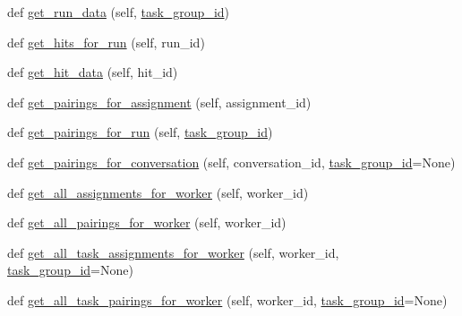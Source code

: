 \begin{DoxyCompactItemize}
\item 
def \hyperlink{classparlai_1_1mturk_1_1core_1_1mturk__data__handler_1_1MTurkDataHandler_a3ded92bcc9f19027c452489e2b06d837}{get\+\_\+run\+\_\+data} (self, \hyperlink{classparlai_1_1mturk_1_1core_1_1mturk__data__handler_1_1MTurkDataHandler_abef46871b0b4686b67f0b4dcea99e81c}{task\+\_\+group\+\_\+id})
\item 
def \hyperlink{classparlai_1_1mturk_1_1core_1_1mturk__data__handler_1_1MTurkDataHandler_a9f4e9c9bec7d5d47efd4492dfb751b5c}{get\+\_\+hits\+\_\+for\+\_\+run} (self, run\+\_\+id)
\item 
def \hyperlink{classparlai_1_1mturk_1_1core_1_1mturk__data__handler_1_1MTurkDataHandler_a753c4a107539e6085fb2fd8402ed35e2}{get\+\_\+hit\+\_\+data} (self, hit\+\_\+id)
\item 
def \hyperlink{classparlai_1_1mturk_1_1core_1_1mturk__data__handler_1_1MTurkDataHandler_a092a03e29a20f0b40b9d33e1e002395a}{get\+\_\+pairings\+\_\+for\+\_\+assignment} (self, assignment\+\_\+id)
\item 
def \hyperlink{classparlai_1_1mturk_1_1core_1_1mturk__data__handler_1_1MTurkDataHandler_a546d30ff4b76188f71e5309f7a881ab2}{get\+\_\+pairings\+\_\+for\+\_\+run} (self, \hyperlink{classparlai_1_1mturk_1_1core_1_1mturk__data__handler_1_1MTurkDataHandler_abef46871b0b4686b67f0b4dcea99e81c}{task\+\_\+group\+\_\+id})
\item 
def \hyperlink{classparlai_1_1mturk_1_1core_1_1mturk__data__handler_1_1MTurkDataHandler_a7456a75caea9fb681067dee584567f27}{get\+\_\+pairings\+\_\+for\+\_\+conversation} (self, conversation\+\_\+id, \hyperlink{classparlai_1_1mturk_1_1core_1_1mturk__data__handler_1_1MTurkDataHandler_abef46871b0b4686b67f0b4dcea99e81c}{task\+\_\+group\+\_\+id}=None)
\item 
def \hyperlink{classparlai_1_1mturk_1_1core_1_1mturk__data__handler_1_1MTurkDataHandler_a13d0c1ca0cf41f7f7aca992c995da261}{get\+\_\+all\+\_\+assignments\+\_\+for\+\_\+worker} (self, worker\+\_\+id)
\item 
def \hyperlink{classparlai_1_1mturk_1_1core_1_1mturk__data__handler_1_1MTurkDataHandler_af115126a912672f030143d16b281c1d3}{get\+\_\+all\+\_\+pairings\+\_\+for\+\_\+worker} (self, worker\+\_\+id)
\item 
def \hyperlink{classparlai_1_1mturk_1_1core_1_1mturk__data__handler_1_1MTurkDataHandler_a6ad4b37c9393559d29d7e0e7a1b93027}{get\+\_\+all\+\_\+task\+\_\+assignments\+\_\+for\+\_\+worker} (self, worker\+\_\+id, \hyperlink{classparlai_1_1mturk_1_1core_1_1mturk__data__handler_1_1MTurkDataHandler_abef46871b0b4686b67f0b4dcea99e81c}{task\+\_\+group\+\_\+id}=None)
\item 
def \hyperlink{classparlai_1_1mturk_1_1core_1_1mturk__data__handler_1_1MTurkDataHandler_a6077d39b847f52f65dc7cedc709ea25c}{get\+\_\+all\+\_\+task\+\_\+pairings\+\_\+for\+\_\+worker} (self, worker\+\_\+id, \hyperlink{classparlai_1_1mturk_1_1core_1_1mturk__data__handler_1_1MTurkDataHandler_abef46871b0b4686b67f0b4dcea99e81c}{task\+\_\+group\+\_\+id}=None)
\end{DoxyCompactItemize}
